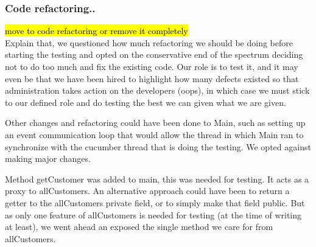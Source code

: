 \subsubsection{Code refactoring..}
\hl{move to code refactoring or remove it completely}\\
Explain that, we questioned how much refactoring we should be doing before starting the testing and opted on the conservative end of the spectrum deciding not to do too much and fix the existing code. Our role is to test it, and it may even be that we have been hired to highlight how many defects existed so that administration takes action on the developers (oops), in which case we must stick to our defined role and do testing the best we can given what we are given. 
\par
Other changes and refactoring could have been done to Main, such as setting up an event communication loop that would allow the thread in which Main ran to synchronize with the cucumber thread that is doing the testing. We opted against making major changes. 

Method getCustomer was added to main, this was needed for testing. It acts as a proxy to allCustomers. An alternative approach could have been to return a getter to the allCustomers private field, or to simply make that field public. But as only one feature of allCustomers is needed for testing (at the time of writing at least), we went ahead an exposed the single method we care for from allCustomers. 

